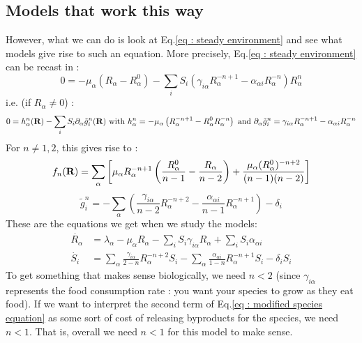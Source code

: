 \documentclass[12pt, titlepage]{report}
\begin{document}
		\subsection{Models that work this way}
		However, what we can do is look at Eq.\eqref{eq : steady environment} and see what models give rise to such an equation.
		More precisely, Eq.\eqref{eq : steady environment} can be recast in :
		\begin{equation}
			0 = - \mu_\alpha (R_\alpha-R_\alpha^0) - \sum_i S_i  \left(\gamma_{i\alpha} R_\alpha^{-n+1}-\alpha_{\alpha i} R_\alpha^{-n} \right)R_\alpha^n
		\end{equation}
		i.e. (if $R_\alpha \neq 0$) :
		\begin{equation}
			0 = h_\alpha^n(\textbf{R})-\sum_i S_i \partial_\alpha \tilde{g}^n_i(\textbf{R}) \text{ with } h^n_\alpha =  -\mu_\alpha\left(R_\alpha^{-n+1}-R_\alpha^0 R_\alpha^{-n}\right) \text{ and } \partial_\alpha \tilde{g}^n_i = \gamma_{i \alpha}R_\alpha^{-n+1}-\alpha_{\alpha i}R_\alpha^{-n}
		\end{equation}
		For $n \neq 1, 2$, this gives rise to :
		\begin{equation}
			f_n(\textbf{R}) = \sum_\alpha \left[\mu_\alpha R_\alpha^{-n+1} \left(\frac{R_\alpha^0}{n-1}-\frac{R_\alpha}{n-2}\right)+\frac{\mu_\alpha (R_\alpha^0)^{-n+2}}{(n-1)(n-2)}\right]
		\end{equation}
		\begin{equation}
			\tilde{g}_i^n = -\sum_\alpha\left(\frac{\gamma_{i\alpha}}{n-2} R_\alpha^{-n+2}-\frac{\alpha_{\alpha i}}{n-1}R_\alpha^{-n+1}\right)-\delta_i
		\end{equation}
		These are the equations we get when we study the models:
		\begin{align}
			\dot{R_\alpha} &= \lambda_\alpha - \mu_\alpha R_\alpha - \sum_i S_i \gamma_{i\alpha}R_\alpha + \sum_i S_i \alpha_{\alpha i} \\
			\dot{S_i}  &=  \sum_\alpha\frac{\gamma_{i\alpha}}{2-n} R_\alpha^{-n+2}S_i-\sum_{\alpha}\frac{\alpha_{\alpha i}}{1-n}R_\alpha^{-n+1}S_i-\delta_iS_i \label{eq : modified species equation}
		\end{align}
		To get something that makes sense biologically, we need $n < 2$ (since $\gamma_{i\alpha}$ represents the food consumption rate : you want your species to grow as they eat food). If we want to interpret the second term of Eq.\eqref{eq : modified species equation} as some sort of cost of releasing byproducts for the species, we need $n<1$. That is, overall we need $n<1$ for this model to make sense.
\end{document}
